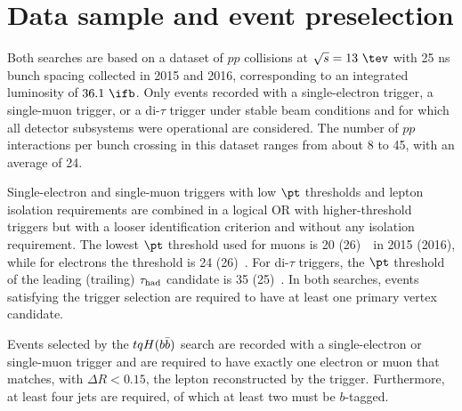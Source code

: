 \section{Data sample and event preselection}
\label{sec:data_presel}

Both searches are based on a dataset of $pp$ collisions at $\sqrt{s}=13~\tev$ with 25 ns bunch spacing collected in 2015 and 2016, corresponding to an integrated luminosity of $36.1~\ifb$.
Only events recorded with a single-electron trigger, a single-muon trigger, or a di-$\tau$ trigger under stable beam conditions 
and for which all detector subsystems were operational are considered.
The number of $pp$ interactions per bunch crossing in this dataset ranges from about 8 to 45, with an average of 24.

Single-electron and single-muon triggers with low $\pt$ thresholds and lepton isolation requirements are combined in a logical OR 
with higher-threshold triggers but with a looser identification criterion and without any isolation requirement.
The lowest $\pt$ threshold used for muons is 20 (26)~\gev\ in 2015 (2016), while for electrons the threshold is 24 (26)~\gev.
For di-$\tau$ triggers, the $\pt$ threshold of the leading (trailing) $\tau_{\mathrm{had}}$ candidate is 35 (25)~\gev.
In both searches, events satisfying the trigger selection are required to have at least one primary vertex candidate.

Events selected by the $tqH(b\bar{b})$ search are recorded with a single-electron or single-muon trigger and 
are required to have exactly one electron or muon that matches, with $\Delta R < 0.15$, the lepton reconstructed by the trigger.  
Furthermore, at least four jets are required, of which at least two must be $b$-tagged.

